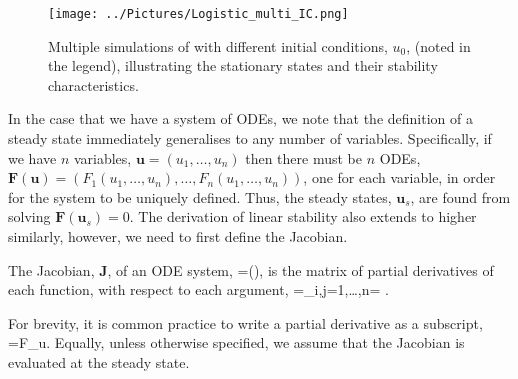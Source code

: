 \begin{figure}[!!!h!!!tb]
\centering
\texttt{[image: ../Pictures/Logistic\_multi\_IC.png]}
\caption{ \label{Logistic_multi_IC} Multiple simulations of  with different initial conditions, $u_0$, (noted in the legend), illustrating the stationary states and  their stability characteristics.}
\end{figure}


In the case that we have a system of ODEs, we note that the definition of a steady state immediately generalises to any number of variables. Specifically, if we have $n$ variables, $\bm{u}=(u_1,\dots,u_n)$ then there must be $n$ ODEs, $\bm{F}(\bm{u})=(F_1(u_1,\dots,u_n),\dots,F_n(u_1,\dots,u_n))$, one for each variable, in order for the system to be uniquely defined. Thus, the steady states, $\bm{u}_s$, are found from solving $\bm{F}(\bm{u}_s)=0$. The derivation of linear stability also extends to higher similarly, however, we need to first define the Jacobian.
\begin{defin}
The Jacobian, $\bm{J}$, of an ODE system,
\bb
{}=(),
\ee
is the matrix of partial derivatives of each function, with respect to each argument,
\bb
{}=\left[ \D{F_i}{u_j}\right]_{i,j=1,\dots,n}= . 
\ee
\end{defin}
For brevity, it is common practice to write a partial derivative as a subscript, \ie
\bb
{}=F_u.
\ee
Equally, unless otherwise specified, we assume that the Jacobian is evaluated at the steady state.

